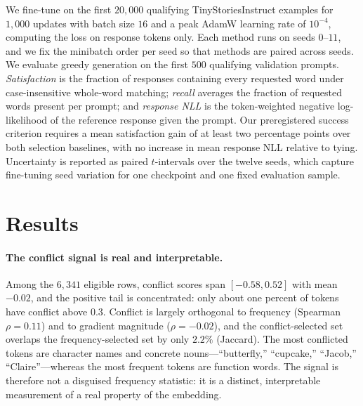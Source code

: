 \documentclass[conference]{IEEEtran}
\begin{document}
We fine-tune on the first $20{,}000$ qualifying TinyStoriesInstruct examples for
$1{,}000$ updates with batch size $16$ and a peak AdamW learning rate of
$10^{-4}$, computing the loss on response tokens only. Each method runs on seeds
$0$--$11$, and we fix the minibatch order per seed so that methods are paired
across seeds. We evaluate greedy generation on the first $500$ qualifying
validation prompts. \emph{Satisfaction} is the fraction of responses containing
every requested word under case-insensitive whole-word matching; \emph{recall}
averages the fraction of requested words present per prompt; and \emph{response
NLL} is the token-weighted negative log-likelihood of the reference response
given the prompt. Our preregistered success criterion requires a mean
satisfaction gain of at least two percentage points over both selection
baselines, with no increase in mean response NLL relative to tying. Uncertainty
is reported as paired $t$-intervals over the twelve seeds, which capture
fine-tuning seed variation for one checkpoint and one fixed evaluation sample.

\section{Results}
\label{sec:results}

\paragraph{The conflict signal is real and interpretable.}
Among the $6{,}341$ eligible rows, conflict scores span $[-0.58,0.52]$ with mean
$-0.02$, and the positive tail is concentrated: only about one percent of tokens
have conflict above $0.3$. Conflict is largely orthogonal to frequency (Spearman
$\rho=0.11$) and to gradient magnitude ($\rho=-0.02$), and the conflict-selected
set overlaps the frequency-selected set by only $2.2\%$ (Jaccard). The most
conflicted tokens are character names and concrete nouns---``butterfly,''
``cupcake,'' ``Jacob,'' ``Claire''---whereas the most frequent tokens are
function words. The signal is therefore not a disguised frequency statistic: it
is a distinct, interpretable measurement of a real property of the embedding.
\end{document}
